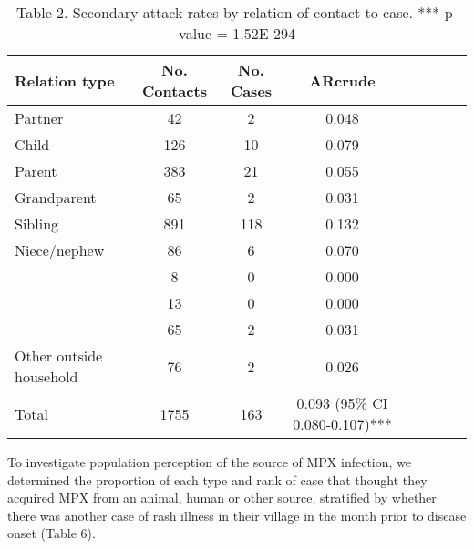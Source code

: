 \begin{table}[!hb]
    \begin{tabular}{@{}lccc@{}}
    \toprule
    Relation type & No. Contacts & No. Cases & ARcrude \\
    \cmidrule
    Partner & 42 & 2 & 0.048 & ~  & ~ & ~ \\ 
    Child & 126 & 10 & 0.079 & ~  & ~ & ~ \\                  
    Parent & 383 & 21 & 0.055 & ~  & ~  & ~ \\
    Grandparent & 65       & 2     & 0.031 & ~  & ~  & ~ \\
    Sibling & 891      & 118   & 0.132  & ~  & ~  & ~ \\
    Niece/nephew & 86       & 6     & 0.070  & ~  & ~  & ~ \\
    ~   & 8        & 0     & 0.000 & ~  & ~  & ~ \\
    ~   & 13       & 0     & 0.000  & ~  & ~  & ~ \\
    ~   & 65       & 2     & 0.031   & ~  & ~  & ~ \\
    Other outside household & 76 & 2 & 0.026 & ~  & ~  & ~ \\
    Total & 1755 & 163 & 0.093 (95\% CI 0.080-0.107)*** \\
    \bottomrule
    \end{tabular}
    \caption{Table 2. Secondary attack rates by relation of contact to case. *** p-value = 1.52E-294}
    \label{table2}
\end{table}


To investigate population perception of the source of MPX infection, we determined the proportion of each type and rank of case that thought they acquired MPX from an animal, human or other source, stratified by whether there was another case of rash illness in their village in the month prior to disease onset (Table 6). 
